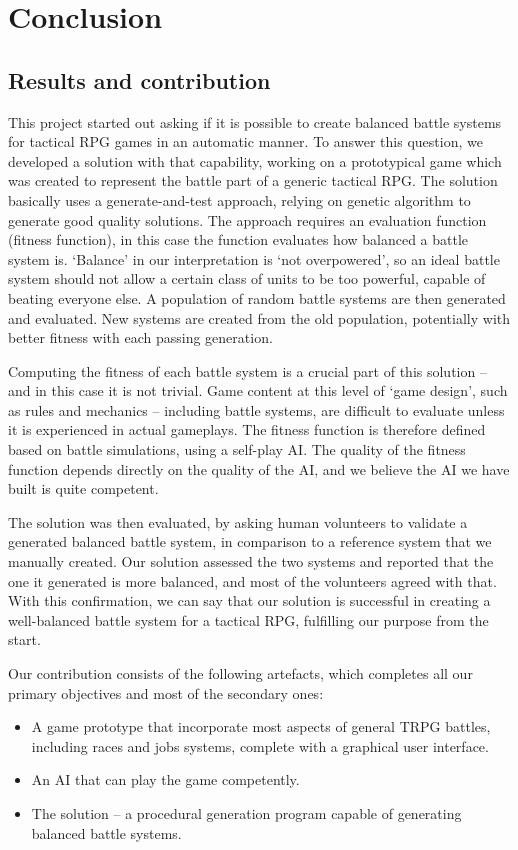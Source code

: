 \chapter{Conclusion}

\section{Results and contribution}

This project started out asking if it is possible to create balanced battle systems for tactical RPG games in an automatic manner. To answer this question, we developed a solution with that capability, working on a prototypical game which was created to represent the battle part of a generic tactical RPG. The solution basically uses a generate-and-test approach, relying on genetic algorithm to generate good quality solutions. The approach requires an evaluation function (fitness function), in this case the function evaluates how balanced a battle system is. `Balance' in our interpretation is `not overpowered', so an ideal battle system should not allow a certain class of units to be too powerful, capable of beating everyone else. A population of random battle systems are then generated and evaluated. New systems are created from the old population, potentially with better fitness with each passing generation.

Computing the fitness of each battle system is a crucial part of this solution -- and in this case it is not trivial. Game content at this level of `game design', such as rules and mechanics -- including battle systems, are difficult to evaluate unless it is experienced in actual gameplays. The fitness function is therefore defined based on battle simulations, using a self-play AI. The quality of the fitness function depends directly on the quality of the AI, and we believe the AI we have built is quite competent.

The solution was then evaluated, by asking human volunteers to validate a generated balanced battle system, in comparison to a reference system that we manually created. Our solution assessed the two systems and reported that the one it generated is more balanced, and most of the volunteers agreed with that. With this confirmation, we can say that our solution is successful in creating a well-balanced battle system for a tactical RPG, fulfilling our purpose from the start.

\bigskip
Our contribution consists of the following artefacts, which completes all our primary objectives and most of the secondary ones:
\begin{itemize}
	\item A game prototype that incorporate most aspects of general TRPG battles, including races and jobs systems, complete with a graphical user interface.
	\item An AI that can play the game competently.
	\item The solution -- a procedural generation program capable of generating balanced battle systems.
\end{itemize}

